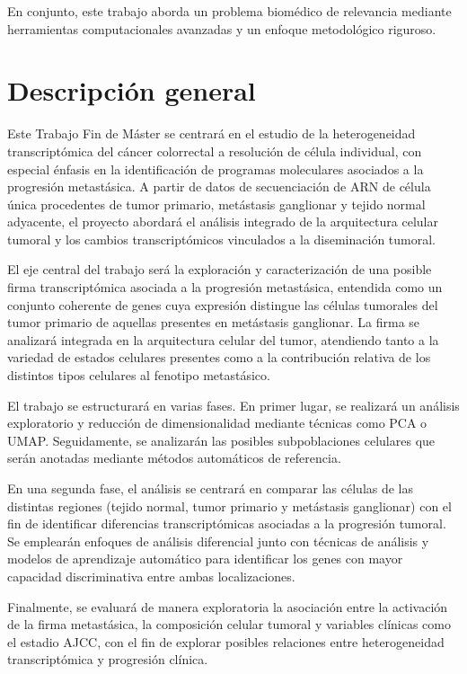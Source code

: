 \documentclass[11pt]{article}
\begin{document}
		
		En conjunto, este trabajo aborda un problema biomédico de relevancia mediante herramientas computacionales avanzadas y un enfoque metodológico riguroso.

	
	\section{Descripción general}
	
		Este Trabajo Fin de Máster se centrará en el estudio de la heterogeneidad transcriptómica del cáncer colorrectal a resolución de célula individual, con especial énfasis en la identificación de programas moleculares asociados a la progresión metastásica. A partir de datos de secuenciación de ARN de célula única procedentes de tumor primario, metástasis ganglionar y tejido normal adyacente, el proyecto abordará el análisis integrado de la arquitectura celular tumoral y los cambios transcriptómicos vinculados a la diseminación tumoral.
		
		
		El eje central del trabajo será la exploración y caracterización de una posible firma transcriptómica asociada a la progresión metastásica, entendida como un conjunto coherente de genes cuya expresión distingue las células tumorales del tumor primario de aquellas presentes en metástasis ganglionar. La firma se analizará integrada en la arquitectura celular del tumor, atendiendo tanto a la variedad de estados celulares presentes como a la contribución relativa de los distintos tipos celulares al fenotipo metastásico. 
		
		
		El trabajo se estructurará en varias fases. En primer lugar, se realizará un análisis exploratorio y reducción de dimensionalidad mediante técnicas como PCA o UMAP. Seguidamente, se analizarán las posibles subpoblaciones celulares que serán anotadas mediante métodos automáticos de referencia.
		
		
		En una segunda fase, el análisis se centrará en comparar las células de las distintas regiones (tejido normal, tumor primario y metástasis ganglionar) con el fin de identificar diferencias transcriptómicas asociadas a la progresión tumoral. Se emplearán enfoques de análisis diferencial junto con técnicas de análisis y modelos de aprendizaje automático para identificar los genes con mayor capacidad discriminativa entre ambas localizaciones.
		
		
		Finalmente, se evaluará de manera exploratoria la asociación entre la activación de la firma metastásica, la composición celular tumoral y variables clínicas como el estadio AJCC, con el fin de explorar posibles relaciones entre heterogeneidad transcriptómica y progresión clínica.
		
\end{document}
